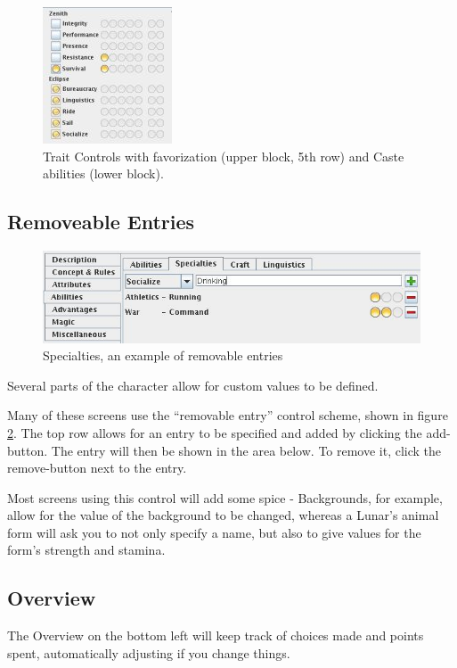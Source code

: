 \begin{figure}
	\centering
		\includegraphics{images/TraitControl.jpg}
	\caption{Trait Controls with favorization (upper block, 5th row) and Caste abilities (lower block).}
	\label{fig:TraitControl}
\end{figure}

\subsection{Removeable Entries}

\begin{figure}
	\centering
		\includegraphics[width=1.00\textwidth]{images/RemovableEntries.jpg}
	\caption{Specialties, an example of removable entries}
	\label{fig:RemovableEntries}
\end{figure}

Several parts of the character allow for custom values to be defined.

Many of these screens use the "`removable entry"' control scheme, shown in figure \ref{fig:RemovableEntries}.
The top row allows for an entry to be specified and added by clicking the add-button. The entry will then be shown in the area below. To remove it, click the remove-button next to the entry.

Most screens using this control will add some spice - Backgrounds, for example, allow for the value of the background to be changed, whereas a Lunar's animal form will ask you to not only specify a name, but also to give values for the form's strength and stamina.

\subsection{Overview}
The Overview on the bottom left will keep track of choices made and points spent, automatically adjusting if you change things. 

